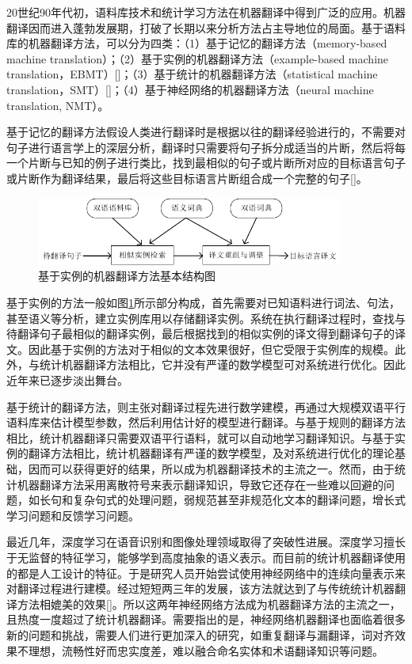 20世纪90年代初，语料库技术和统计学习方法在机器翻译中得到广泛的应用。机器翻译因而进入蓬勃发展期，打破了长期以来分析方法占主导地位的局面。基于语料库的机器翻译方法，可以分为四类：（1）基于记忆的翻译方法（memory-based machine translation）；（2）基于实例的机器翻译方法（example-based machine translation，EBMT）[\cite{Nagao:1984}]；（3）基于统计的机器翻译方法（statistical machine translation，SMT）[\cite{Brown:1990,Brown:1993,Koehn:2003,Koehn:2007,Chiang:2005,Chiang:2007}]；（4）基于神经网络的机器翻译方法（neural machine translation, NMT）。

基于记忆的翻译方法假设人类进行翻译时是根据以往的翻译经验进行的，不需要对句子进行语言学上的深层分析，翻译时只需要将句子拆分成适当的片断，然后将每一个片断与已知的例子进行类比，找到最相似的句子或片断所对应的目标语言句子或片断作为翻译结果，最后将这些目标语言片断组合成一个完整的句子[\cite{Sato:1990}]。

\begin{figure}[!htbp]
	\centering
	\includegraphics[width=0.9\textwidth]{Figure/Figure_2_1.pdf}
	\caption{基于实例的机器翻译方法基本结构图}
	\label{Fig_ebmt}
\end{figure}

基于实例的方法一般如图\ref{Fig_ebmt}所示部分构成，首先需要对已知语料进行词法、句法，甚至语义等分析，建立实例库用以存储翻译实例。系统在执行翻译过程时，查找与待翻译句子最相似的翻译实例，最后根据找到的相似实例的译文得到翻译句子的译文。因此基于实例的方法对于相似的文本效果很好，但它受限于实例库的规模。此外，与统计机器翻译方法相比，它并没有严谨的数学模型可对系统进行优化。因此近年来已逐步淡出舞台。

基于统计的翻译方法，则主张对翻译过程先进行数学建模，再通过大规模双语平行语料库来估计模型参数，然后利用估计好的模型进行翻译。与基于规则的翻译方法相比，统计机器翻译只需要双语平行语料，就可以自动地学习翻译知识。与基于实例的翻译方法相比，统计机器翻译有严谨的数学模型，及对系统进行优化的理论基础，因而可以获得更好的结果，所以成为机器翻译技术的主流之一。然而，由于统计机器翻译方法采用离散符号来表示翻译知识，导致它还存在一些难以回避的问题，如长句和复杂句式的处理问题，弱规范甚至非规范化文本的翻译问题，增长式学习问题和反馈学习问题。

最近几年，深度学习在语音识别和图像处理领域取得了突破性进展。深度学习擅长于无监督的特征学习，能够学到高度抽象的语义表示。而目前的统计机器翻译使用的都是人工设计的特征。于是研究人员开始尝试使用神经网络中的连续向量表示来对翻译过程进行建模。经过短短两三年的发展，该方法就达到了与传统统计机器翻译方法相媲美的效果[\cite{Kalchbrenner:2013,Sutskever:2014,Cho:2014,Bahdanau:2015}]。所以这两年神经网络方法成为机器翻译方法的主流之一，且热度一度超过了统计机器翻译。需要指出的是，神经网络机器翻译也面临着很多新的问题和挑战，需要人们进行更加深入的研究，如重复翻译与漏翻译，词对齐效果不理想，流畅性好而忠实度差，难以融合命名实体和术语翻译知识等问题。


